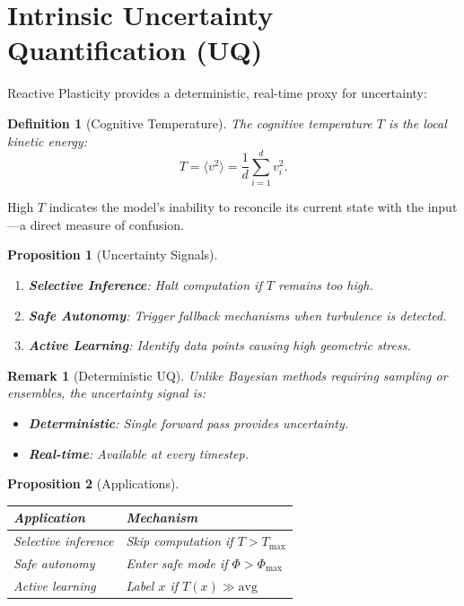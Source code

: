 \documentclass[12pt,letterpaper,twoside]{article}
\newtheorem{definition}{Definition}[section]
\newtheorem{remarque}{Remark}[section]
\newtheorem{prop}{Proposition}[section]
\begin{document}
\section{Intrinsic Uncertainty Quantification (UQ)}

Reactive Plasticity provides a deterministic, real-time proxy for uncertainty:

\begin{definition}[Cognitive Temperature]
The cognitive temperature $T$ is the local kinetic energy:
\[
T = \langle v^2 \rangle = \frac{1}{d} \sum_{i=1}^d v_i^2.
\]
\end{definition}

High $T$ indicates the model's inability to reconcile its current state with the input---a direct measure of confusion.

\begin{prop}[Uncertainty Signals]
\begin{enumerate}
\item \textbf{Selective Inference}: Halt computation if $T$ remains too high.
\item \textbf{Safe Autonomy}: Trigger fallback mechanisms when turbulence is detected.
\item \textbf{Active Learning}: Identify data points causing high geometric stress.
\end{enumerate}
\end{prop}

\begin{remarque}[Deterministic UQ]
Unlike Bayesian methods requiring sampling or ensembles, the uncertainty signal is:
\begin{itemize}
\item \textbf{Deterministic}: Single forward pass provides uncertainty.
\item \textbf{Real-time}: Available at every timestep.
\end{itemize}
\end{remarque}

\begin{prop}[Applications]
\begin{center}
\begin{tabular}{p{}p{}}
\toprule
Application & Mechanism \\ \midrule
Selective inference & Skip computation if $T > T_{\max}$ \\
Safe autonomy & Enter safe mode if $\Phi > \Phi_{\max}$ \\
Active learning & Label $x$ if $T(x) \gg \text{avg}$ \\ \bottomrule
\end{tabular}
\end{center}
\end{prop}
\end{document}
